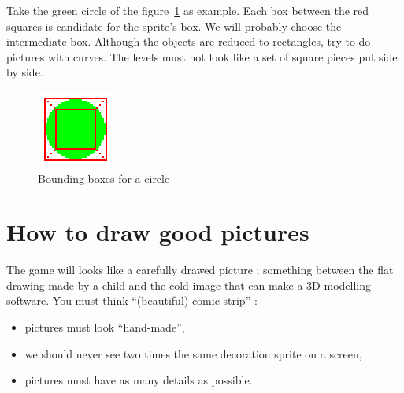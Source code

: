 \documentclass{article}
\begin{document}
Take the green circle of the figure~\ref{fig-bounding-box} as
example. Each box between the red squares is candidate for the
sprite's box. We will probably choose the intermediate box.  Although
the objects are reduced to rectangles, try to do pictures with
curves. The levels must not look like a set of square pieces put side
by side.

\begin{figure}
\begin{center}
\includegraphics{pictures/bounding-box}
\caption{Bounding boxes for a circle}
\label{fig-bounding-box}
\end{center}
\end{figure}

\section{How to draw good pictures}

The game will looks like a carefully drawed picture ; something
between the flat drawing made by a child and the cold image that
can make a 3D-modelling software. You must think ``(beautiful) comic
strip'' :
\begin{itemize}
\item pictures must look ``hand-made'',
\item we should never see two times the same decoration sprite on a screen,
\item pictures must have as many details as possible.
\end{itemize}
\end{document}
